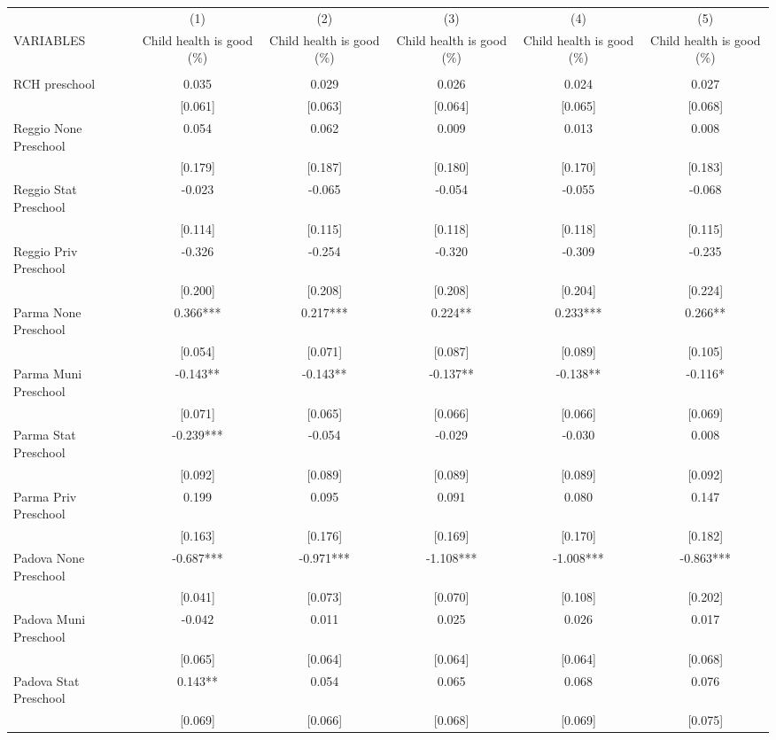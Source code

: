 \begin{tabular}{lccccc} \hline
 & (1) & (2) & (3) & (4) & (5) \\
VARIABLES & Child health is good (\%) & Child health is good (\%) & Child health is good (\%) & Child health is good (\%) & Child health is good (\%) \\ \hline
 &  &  &  &  &  \\
RCH preschool & 0.035 & 0.029 & 0.026 & 0.024 & 0.027 \\
 & [0.061] & [0.063] & [0.064] & [0.065] & [0.068] \\
Reggio None Preschool & 0.054 & 0.062 & 0.009 & 0.013 & 0.008 \\
 & [0.179] & [0.187] & [0.180] & [0.170] & [0.183] \\
Reggio Stat Preschool & -0.023 & -0.065 & -0.054 & -0.055 & -0.068 \\
 & [0.114] & [0.115] & [0.118] & [0.118] & [0.115] \\
Reggio Priv Preschool & -0.326 & -0.254 & -0.320 & -0.309 & -0.235 \\
 & [0.200] & [0.208] & [0.208] & [0.204] & [0.224] \\
Parma None Preschool & 0.366*** & 0.217*** & 0.224** & 0.233*** & 0.266** \\
 & [0.054] & [0.071] & [0.087] & [0.089] & [0.105] \\
Parma Muni Preschool & -0.143** & -0.143** & -0.137** & -0.138** & -0.116* \\
 & [0.071] & [0.065] & [0.066] & [0.066] & [0.069] \\
Parma Stat Preschool & -0.239*** & -0.054 & -0.029 & -0.030 & 0.008 \\
 & [0.092] & [0.089] & [0.089] & [0.089] & [0.092] \\
Parma Priv Preschool & 0.199 & 0.095 & 0.091 & 0.080 & 0.147 \\
 & [0.163] & [0.176] & [0.169] & [0.170] & [0.182] \\
Padova None Preschool & -0.687*** & -0.971*** & -1.108*** & -1.008*** & -0.863*** \\
 & [0.041] & [0.073] & [0.070] & [0.108] & [0.202] \\
Padova Muni Preschool & -0.042 & 0.011 & 0.025 & 0.026 & 0.017 \\
 & [0.065] & [0.064] & [0.064] & [0.064] & [0.068] \\
Padova Stat Preschool & 0.143** & 0.054 & 0.065 & 0.068 & 0.076 \\
 & [0.069] & [0.066] & [0.068] & [0.069] & [0.075] \\

\end{tabular}

